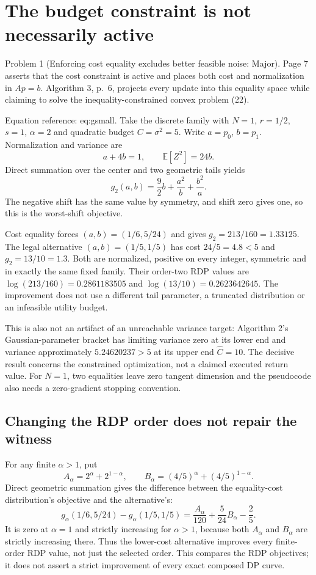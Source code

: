 \documentclass[10pt]{article}
\begin{document}
\section*{The budget constraint is not necessarily active}
Problem 1 (Enforcing cost equality excludes better feasible noise: Major).  Page 7 asserts that the cost constraint is active and places both cost and normalization in \(Ap=b\). Algorithm 3, p. 6, projects every update into this equality space while claiming to solve the inequality-constrained convex problem (22).\par
Equation reference: eq:gsmall. Take the discrete family with \(N=1\), \(r=1/2\), \(s=1\), \(\alpha=2\) and quadratic budget \(C=\sigma^2=5\). Write \(a=p_0\), \(b=p_1\). Normalization and variance are \[a+4b=1,\qquad \mathbb E[Z^2]=24b.\] Direct summation over the center and two geometric tails yields \[
g_2(a,b)=\frac92b+\frac{a^2}{b}+\frac{b^2}{a}.\] The negative shift has the same value by symmetry, and shift zero gives one, so this is the worst-shift objective.\par
Cost equality forces \((a,b)=(1/6,5/24)\) and gives \(g_2=213/160=1.33125\). The legal alternative \((a,b)=(1/5,1/5)\) has cost \(24/5=4.8<5\) and \(g_2=13/10=1.3\). Both are normalized, positive on every integer, symmetric and in exactly the same fixed family. Their order-two RDP values are \(\log(213/160)=0.2861183505\) and \(\log(13/10)=0.2623642645\). The improvement does not use a different tail parameter, a truncated distribution or an infeasible utility budget.\par
This is also not an artifact of an unreachable variance target: Algorithm 2’s Gaussian-parameter bracket has limiting variance zero at its lower end and variance approximately \(5.24620237>5\) at its upper end \(\widehat C=10\). The decisive result concerns the constrained optimization, not a claimed executed return value. For \(N=1\), two equalities leave zero tangent dimension and the pseudocode also needs a zero-gradient stopping convention.\par
\subsection*{Changing the RDP order does not repair the witness}
For any finite \(\alpha>1\), put \[A_\alpha=2^\alpha+2^{1-\alpha},\qquad
B_\alpha=(4/5)^\alpha+(4/5)^{1-\alpha}.\] Direct geometric summation gives the difference between the equality-cost distribution’s objective and the alternative’s: \[g_\alpha(1/6,5/24)-g_\alpha(1/5,1/5)
=\frac{A_\alpha}{120}+\frac5{24}B_\alpha-\frac25.\] It is zero at \(\alpha=1\) and strictly increasing for \(\alpha>1\), because both \(A_\alpha\) and \(B_\alpha\) are strictly increasing there. Thus the lower-cost alternative improves every finite-order RDP value, not just the selected order. This compares the RDP objectives; it does not assert a strict improvement of every exact composed DP curve.\par
\end{document}
